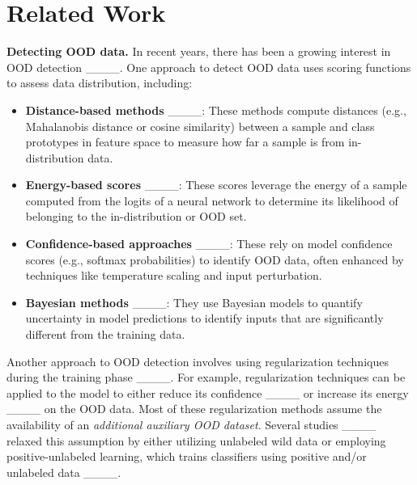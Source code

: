\section{Related Work}
\label{sec:related works}
\vspace{-0.1cm}

\textbf{Detecting OOD data.}
In recent years, there has been a growing interest in OOD detection ____. 
One approach to detect OOD data uses scoring functions to assess data distribution, including:

\vspace{-0.2cm}
\begin{itemize}
    \vspace{-0.2cm}
    \item \textbf{Distance-based methods} ____: 
    These methods compute distances (e.g., Mahalanobis distance or cosine similarity) between a sample and class prototypes in feature space to measure how far a sample is from in-distribution data.
    \vspace{-0.2cm}
    \item \textbf{Energy-based scores} ____: These scores leverage the energy of a sample computed from the logits of a neural network to determine its likelihood of belonging to the in-distribution or OOD set.
    \vspace{-0.2cm}
    \item \textbf{Confidence-based approaches} ____:
   These rely on model confidence scores (e.g., softmax probabilities) to identify OOD data, often enhanced by techniques like temperature scaling and input perturbation.
    \vspace{-0.2cm}
    \item \textbf{Bayesian methods} ____: 
    They use Bayesian models to quantify uncertainty in model predictions to identify inputs that are significantly different from the training data.
\end{itemize}
\vspace{-0.4cm}
Another approach to OOD detection involves using regularization techniques during the training phase ____.
For example, regularization techniques can be applied to the model to either reduce its confidence ____ or increase its energy ____ on the OOD data.
Most of these regularization methods assume the availability of an \emph{additional auxiliary OOD dataset}. 
Several studies ____ relaxed this assumption by either utilizing unlabeled wild data or employing positive-unlabeled learning, which trains classifiers using positive and/or unlabeled data ____. 
